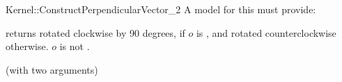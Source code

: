 \begin{ccRefFunctionObjectConcept}{Kernel::ConstructPerpendicularVector_2}
A model for this must provide:


{returns  rotated clockwise by 90 degrees, if $o$ is
, and rotated counterclockwise otherwise.
\ccPrecond $o$ is not .
}

\ccRefines
{} (with two arguments)

\ccSeeAlso
{} \\

\end{ccRefFunctionObjectConcept}
